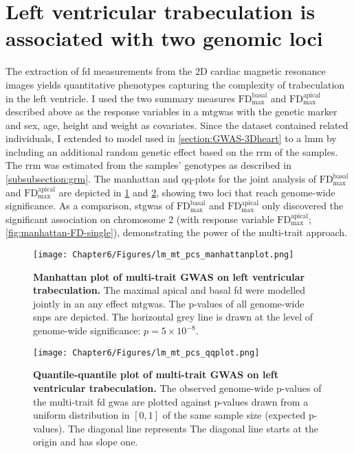 \section{Left ventricular trabeculation is associated with two genomic loci}
The extraction of \gls{fd} measurements from the 2D cardiac magnetic resonance images yields quantitative phenotypes capturing the complexity of trabeculation in the left ventricle. I used the two summary measures \(\text{FD}_\text{max}^\text{basal}\) and \(\text{FD}_\text{max}^\text{apical}\) described above as the response variables in a \gls{mtgwas} with the genetic marker and sex, age, height and weight as covariates. Since the dataset contained related individuals, I extended to model used in \cref{section:GWAS-3Dheart} to a \gls{lmm} by including an additional random genetic effect based on the \gls{rrm} of the samples. The \gls{rrm} was estimated from the samples' genotypes as described in \cref{subsubsection:grm}. The manhattan and qq-plots for the joint analysis of \(\text{FD}_\text{max}^\text{basal}\) and \(\text{FD}_\text{max}^\text{apical}\) are depicted in \cref{fig:manhattan-FD} and \cref{fig:qq-FD}, showing two loci that reach genome-wide significance. As a comparison, \gls{stgwas} of  \(\text{FD}_\text{max}^\text{basal}\) and \(\text{FD}_\text{max}^\text{apical}\) only discovered the significant association on chromosome 2 (with response variable \(\text{FD}_\text{max}^\text{apical}\); \cref{fig:manhattan-FD-single}), demonstrating the power of the multi-trait approach.
%
\begin{figure}[hbtp]
	\centering
	\texttt{[image: Chapter6/Figures/lm\_mt\_pcs\_manhattanplot.png]}
	\caption[\textbf{Manhattan plot of multi-trait GWAS on left ventricular trabeculation. }]{\textbf{Manhattan plot of multi-trait GWAS on left ventricular trabeculation. } The maximal apical and basal \gls{fd} were modelled jointly in an any effect \gls{mtgwas}. The p-values of all genome-wide \glspl{snp} are depicted. The horizontal grey line is drawn at the level of genome-wide significance: \(p = 5 \times 10^{-8}\).} 
	 	\label{fig:manhattan-FD}
\end{figure}
%
\begin{figure}[hbtp]
	\centering
	\texttt{[image: Chapter6/Figures/lm\_mt\_pcs\_qqplot.png]}
	\caption[\textbf{Quantile-quantile plot of multi-trait GWAS on left ventricular trabeculation .}]{\textbf{Quantile-quantile plot of multi-trait GWAS on left ventricular trabeculation.} The observed genome-wide p-values of the multi-trait \gls{fd} \gls{gwas} are plotted against p-values drawn from a uniform distribution in \([0,1]\) of the same sample size (expected p-values). The diagonal line represents The diagonal line starts at the origin and has slope one.} 
	 	\label{fig:qq-FD}
\end{figure}
